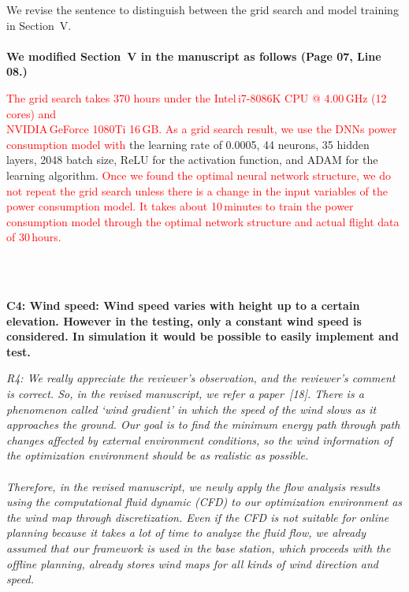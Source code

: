 \documentclass[onecolumn]{IEEEconf}
\begin{document}
\begin{description}
{    We revise the sentence to distinguish between the grid search and model training in Section~V.
	}
	~\\
    ~\\
    \textbf{We modified Section~V in the manuscript as follows (Page 07, Line 08.)}\\
    \begin{mdframed}[ linewidth=.75pt, userdefinedwidth=0.9\textwidth]
    \textcolor{red}{The grid search takes 370 hours under the Intel\textregistered \,i7-8086K CPU @ 4.00\,GHz (12 cores) and\\ NVIDIA\textregistered \,GeForce 1080Ti 16\,GB. 
    As a grid search result, we use the DNNs power consumption model with} the learning rate of 0.0005, 44 neurons, 35 hidden layers, 2048 batch size, ReLU for the activation function, and ADAM for the learning algorithm.
    \textcolor{red}{Once we found the optimal neural network structure, we do not repeat the grid search unless there is a change in the input variables of the power consumption model.
    It takes about 10\,minutes to train the power consumption model through the optimal network structure and actual flight data of 30\,hours.}
    \end{mdframed}
	~\\
	~\\
    \item \textbf
    {
	C4: Wind speed:
Wind speed varies with height up to a certain elevation. However in the testing, only a constant wind speed is considered. In simulation it would be possible to easily implement and test.
	}
	\item \textit
	{
	R4: We really appreciate the reviewer’s observation, and the reviewer’s comment is correct. So, in the revised manuscript, we refer a paper~[18]. There is a phenomenon called ‘wind gradient’ in which the speed of the wind slows as it approaches the ground.
    Our goal is to find the minimum energy path through path changes affected by external environment conditions, so the wind information of the optimization environment should be as realistic as possible.~\\~\\
    Therefore, in the revised manuscript, we newly apply the flow analysis results using the computational fluid dynamic (CFD) to our optimization environment as the wind map through discretization.
    Even if the CFD is not suitable for online planning because it takes a lot of time to analyze the fluid flow, we already assumed that our framework is used in the base station, which proceeds with the offline planning, already stores wind maps for all kinds of wind direction and speed.
}
\end{description}
\end{document}
